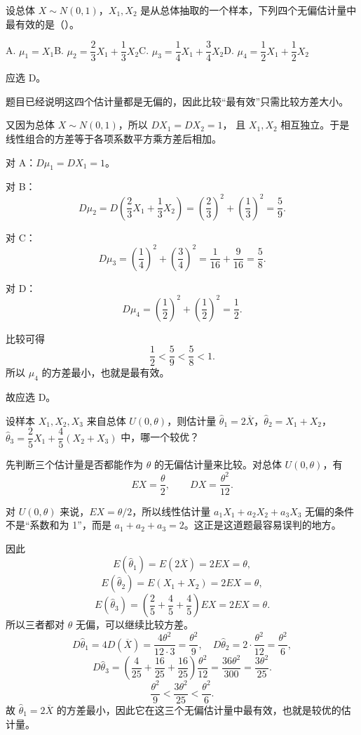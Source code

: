 ﻿\documentclass[lang=cn,11pt]{elegantbook}
\begin{document}
\begin{exercise}\label{exer:7-eff-N01}
设总体 \(X \sim N(0,1)\)，\(X_1, X_2\) 是从总体抽取的一个样本，下列四个无偏估计量中最有效的是（\quad）。\par
A. \(\mu_1 = X_1\)\qquad B. \(\mu_2 = \dfrac{2}{3}X_1+\dfrac{1}{3}X_2\)\qquad C. \(\mu_3 = \dfrac{1}{4}X_1+\dfrac{3}{4}X_2\)\qquad D. \(\mu_4 = \dfrac{1}{2}X_1+\dfrac{1}{2}X_2\)
\end{exercise}
\begin{solution}
应选 D。

题目已经说明这四个估计量都是无偏的，因此比较“最有效”只需比较方差大小。

又因为总体 \(X\sim N(0,1)\)，所以 \(DX_1=DX_2=1\)，
且 \(X_1,X_2\) 相互独立。于是线性组合的方差等于各项系数平方乘方差后相加。

对 A：\(D\mu_1=DX_1=1\)。

对 B：
\[
D\mu_2=D\!\left(\frac23X_1+\frac13X_2\right)
=\left(\frac23\right)^2+\left(\frac13\right)^2
=\frac59.
\]

对 C：
\[
D\mu_3=\left(\frac14\right)^2+\left(\frac34\right)^2
=\frac{1}{16}+\frac{9}{16}
=\frac58.
\]

对 D：
\[
D\mu_4=\left(\frac12\right)^2+\left(\frac12\right)^2=\frac12.
\]

比较可得
\[
\frac12<\frac59<\frac58<1.
\]
所以 \(\mu_4\) 的方差最小，也就是最有效。

故应选 D。
\end{solution}


\begin{exercise}\label{exer:7-u0-compare}
设样本 \(X_1, X_2, X_3\) 来自总体 \(U(0,\theta)\)，则估计量 \(\hat{\theta}_1=2\overline{X}\)，\(\hat{\theta}_2=X_1+X_2\)，\(\hat{\theta}_3=\dfrac{2}{5}X_1+\dfrac{4}{5}(X_2+X_3)\) 中，哪一个较优？
\end{exercise}
\begin{solution}
先判断三个估计量是否都能作为 \(\theta\) 的无偏估计量来比较。对总体 \(U(0,\theta)\)，有
\[
EX=\frac{\theta}{2},\qquad DX=\frac{\theta^2}{12}.
\]
\begin{note}
对 \(U(0,\theta)\) 来说，\(EX=\theta/2\)，所以线性估计量 \(a_1X_1+a_2X_2+a_3X_3\) 无偏的条件不是“系数和为 1”，而是 \(a_1+a_2+a_3=2\)。这正是这道题最容易误判的地方。
\end{note}
因此
\[
E(\hat{\theta}_1)=E(2\overline{X})=2EX=\theta,
\]
\[
E(\hat{\theta}_2)=E(X_1+X_2)=2EX=\theta,
\]
\[
E(\hat{\theta}_3)=\left(\frac25+\frac45+\frac45\right)EX=2EX=\theta.
\]
所以三者都对 \(\theta\) 无偏，可以继续比较方差。
\[
D\hat{\theta}_1 = 4D(\overline{X}) = \frac{4\theta^2}{12\cdot3} = \frac{\theta^2}{9},
\quad
D\hat{\theta}_2 = 2\cdot\frac{\theta^2}{12} = \frac{\theta^2}{6},
\]
\[
D\hat{\theta}_3 = \left(\frac{4}{25}+\frac{16}{25}+\frac{16}{25}\right)\frac{\theta^2}{12} = \frac{36\theta^2}{300} = \frac{3\theta^2}{25}.
\]
\[
\frac{\theta^2}{9}<\frac{3\theta^2}{25}<\frac{\theta^2}{6}.
\]
故 \(\hat{\theta}_1=2\overline{X}\) 的方差最小，因此它在这三个无偏估计量中最有效，也就是较优的估计量。
\end{solution}
\end{document}
